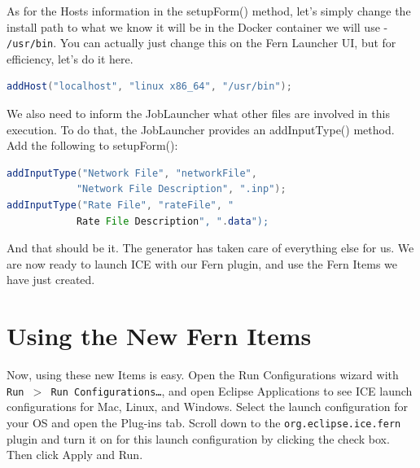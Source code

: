 As for the Hosts information in the setupForm() method, let's simply change the
install path to what we know it will be in the Docker container we will use -
\texttt{/usr/bin}.
You can actually just change this on the Fern Launcher UI, but for efficiency, let's
do it here. 
\begin{lstlisting}[language=Java]
addHost("localhost", "linux x86_64", "/usr/bin");
\end{lstlisting}
We also need to inform the JobLauncher what other files are involved in this
execution. To do that, the JobLauncher provides an addInputType() method. Add
the following to setupForm():
\begin{lstlisting}[language=Java]
addInputType("Network File", "networkFile", 
			"Network File Description", ".inp");
addInputType("Rate File", "rateFile", "
			Rate File Description", ".data");
\end{lstlisting}

And that should be it.
The generator has taken care of everything else for us.
We are now ready to launch ICE with our Fern plugin, and use the Fern Items we
have just created.

\section*{Using the New Fern Items}
Now, using these new Items is easy. Open the Run Configurations wizard with
\texttt{Run $>$ Run Configurations\ldots}, and open Eclipse Applications to see ICE
launch configurations for Mac, Linux, and Windows. Select the launch configuration for your OS and open the Plug-ins
tab. Scroll down to the \texttt{org.eclipse.ice.fern} plugin and turn it on for
this launch configuration by clicking the check box. Then click Apply and Run. 

